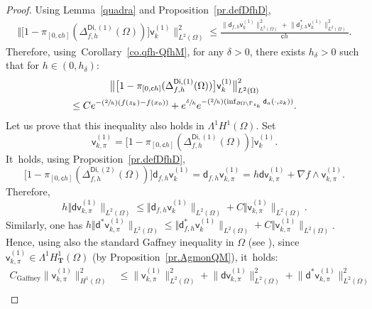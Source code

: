 \documentclass[JEP,XML,SOM,Unicode,NoEqCountersInSection,NoFloatCountersInSection,published]{cedram}
\newcommand{\Psfrac}[2]{(\sfrac{#1}{#2})}
\newcommand{\mbf}[1]{\mathbf{#1}}
\theoremstyle{plain}
\theoremstyle{definition}
\begin{document}
\begin{proof}
Using Lemma~\ref{quadra} and Proposition~\ref{pr.defDfhD},\vspace*{-3pt}
\begin{align*}
\big \Vert \big[1-\pi_{[0,\mathsf ch]} (\Delta_{f,h}^{\mathsf{Di},(1)} (\Omega)) \big] \mathsf v_k^{(1)} \big \|^{2}_{ L^{2} (\Omega)} \le \frac{ \big \| \mathsf d_{f,h} \mathsf v_k^{(1)} \big \|^{2}_{ L^{2} (\Omega)}+
\big \| \mathsf d^{*}_{f,h} \mathsf v_k^{(1)} \big \|^{2}_{ L^{2} (\Omega)}}{\mathsf ch}.
\end{align*}
Therefore, using~Corollary~\ref{co.qfh-QfhM}, for any $\delta>0$,
there exists $h_\delta>0$ such that for $h\in (0,h_\delta)$:\vspace*{-5pt}
\begin{multline*}
\big \Vert \big[1-\pi_{[0,\mathsf ch]} (\Delta_{f,h}^{\mathsf{Di},(1)} (\Omega)) \big] \mathsf v_k^{(1)} \big \|^{2}_{ L^{2} (\Omega)}\\
\le C e^{-\Psfrac 2h(f(z_k)-f(x_0))}+e^{\sfrac{ \delta }{h}} e^{-\Psfrac 2h(\inf_{ \partial \Omega \setminus \Gamma_{z_k}} \mathsf d_a(\cdot,z_k))}.
\end{multline*}
Let us prove that this inequality also holds in $\Lambda^1H^1(\Omega)$.
Set
\[
\mathsf v_{k,\pi}^{(1)}=\big[1-\pi_{[0,\mathsf ch]} (\Delta_{f,h}^{\mathsf{Di},(1)} (\Omega)) \big] \mathsf v_k^{(1)}.
\]
It~holds, using Proposition~\ref{pr.defDfhD},
\[
\big[1-\pi_{[0,\mathsf ch]} (\Delta_{f,h}^{\mathsf{Di},(2)} (\Omega)) \big]\mathsf d_{f,h} \mathsf v_k^{(1)} = \mathsf d_{f,h}\mathsf v_{k,\pi}^{(1)}=h\mathsf d \mathsf v_{k,\pi}^{(1)} +\nabla f\wedge \mathsf v_{k,\pi}^{(1)}.
\]
Therefore,
\[
h \Vert \mathsf d \mathsf v_{k,\pi}^{(1)} \|_{ L^{2} (\Omega)} \le \Vert \mathsf d_{f,h} \mathsf v_k^{(1)} \|_{ L^{2} (\Omega)} + C\Vert \mathsf v_{k,\pi}^{(1)} \|_{ L^{2} (\Omega)}.
\]
Similarly, one has $h \Vert \mathsf d^* \mathsf v_{k,\pi}^{(1)} \|_{ L^{2} (\Omega)} \le \Vert \mathsf d^*_{f,h} \mathsf v_k^{(1)} \|_{ L^{2} (\Omega)} + C\Vert \mathsf v_{k,\pi}^{(1)} \|_{ L^{2} (\Omega)}$.
Hence, using also the standard Gaffney inequality in $\Omega$ (see \cite{GSchw}), since $\mathsf v_{k,\pi}^{(1)}\in \Lambda^1H^1_{\mbf T}(\Omega)$ (by Proposition~\ref{pr.AgmonQM}), it~holds:
\begin{align}
\nonumber
C_{\text{Gaffney}}\big \| \mathsf v_{k,\pi}^{(1)} \big \|^{2}_{ H^1 (\Omega)}&\le \big \| \mathsf v_{k,\pi}^{(1)} \big \|^{2}_{ L^{2} (\Omega)} + \big \| \mathsf d \mathsf v_{k,\pi}^{(1)} \big \|^{2}_{ L^{2} (\Omega)}+
\big \| \mathsf d^{*} \mathsf v_{k,\pi}^{(1)} \big \|^{2}_{ L^{2} (\Omega)}\\

\end{align}
\end{proof}
\end{document}
